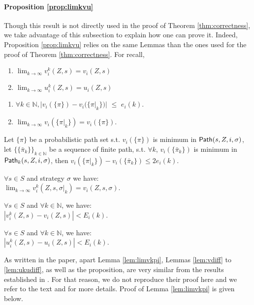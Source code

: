 \paragraph{Proposition \ref{prop:limkvu}} Though this result is not directly used in the proof of Theorem \ref{thm:correctness}, we take advantage of this subsection to explain how one can prove it. Indeed, Proposition \ref{prop:limkvu} relies on the same Lemmas than the ones used for the proof of Theorem \ref{thm:correctness}.
For recall,
\begin{proposition}\label{prop:limkvu}
	\begin{enumerate}
		\item $\lim_{k\to\infty} v_i^{k}(Z,s)=v_i(Z,s)$
		\item $\lim_{k\to\infty} u_i^{k}(Z,s)=u_i(Z,s)$
	\end{enumerate}
\end{proposition}
\begin{lemma}\label{lem:limvkpi}
	\begin{enumerate}
		\item $\forall k\in \mathbb{N}, |v_i(\{\pi\})-v_i(\{\pi|_k\})|$ $\le$ $e_i(k)$.	
		\item $\lim_{k\to\infty}  v_i(\{\pi|_k\})=v_i(\{\pi\})$.
	\end{enumerate}
\end{lemma}
\begin{lemma}\label{lem:vdiff}
	Let $\{ \pi \}$ be a probabilistic path set s.t. $v_i(\{\pi\})$ is minimum in ${\sf Path}(s,Z,i,\sigma)$, let $\{\{\bar\pi_k \} \}_{k \in \mathbb{N}}$ be a sequence of finite path, s.t. $\forall k$, $v_i(\{\bar\pi_k   \})$ is minimum in ${\sf Path}_k(s,Z,i,\sigma)$, then $v_i(\{\pi|_k\})-v_i(\{\bar\pi_k\}) \le 2e_i(k)$.
\end{lemma}
\begin{lemma}\label{lem:limvkz}
	$\forall s\in S$ and strategy $\sigma$ we have:\\
	$\lim_{k\to\infty} v_i^{k}(Z,s,\sigma|_k) = v_i(Z,s,\sigma) $.
\end{lemma}
\begin{lemma}\label{lem:vkvdiff}
	$\forall  s\in S$ and $\forall k \in \mathbb{N}$, we have:\\
	$|v_i^{k}(Z,s)-v_i(Z,s)| < E_i(k)$.
\end{lemma}
\begin{lemma}\label{lem:ukudiff}
	$\forall s\in S$ and $\forall k \in \mathbb{N}$, we have: \\
	$|u_i^{k}(Z,s) - u_i(Z,s)| < E_i(k)$.
\end{lemma}
As written in the paper, apart Lemma \ref{lem:limvkpi}, Lemmas \ref{lem:vdiff} to \ref{lem:ukudiff}, as well as the proposition, are very similar from the results established in \cite{MariPhD}. For that reason, we do not reproduce their proof here and we refer to the text and \cite{MariPhD} for more details. Proof of Lemma \ref{lem:limvkpi} is given below.

